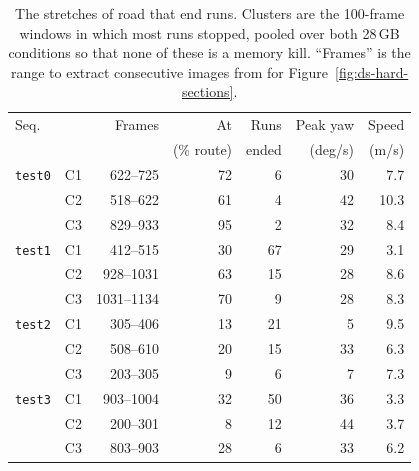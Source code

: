 \begin{table}[!htbp]
\centering
\caption{The stretches of road that end runs. Clusters are the 100-frame windows in which most runs stopped, pooled over both 28\,GB conditions so that none of these is a memory kill. ``Frames'' is the range to extract consecutive images from for Figure~\ref{fig:ds-hard-sections}.}
\label{tab:ds-hard-clusters}
\small
\begin{tabular}{@{}llrrrrr@{}}
\toprule
Seq. & & Frames & At & Runs & Peak yaw & Speed \\
 & & & (\% route) & ended & (deg/s) & (m/s) \\
\midrule
\texttt{test0} & C1 & 622--725 & 72 & 6 & 30 & 7.7 \\
 & C2 & 518--622 & 61 & 4 & 42 & 10.3 \\
 & C3 & 829--933 & 95 & 2 & 32 & 8.4 \\
\texttt{test1} & C1 & 412--515 & 30 & 67 & 29 & 3.1 \\
 & C2 & 928--1031 & 63 & 15 & 28 & 8.6 \\
 & C3 & 1031--1134 & 70 & 9 & 28 & 8.3 \\
\texttt{test2} & C1 & 305--406 & 13 & 21 & 5 & 9.5 \\
 & C2 & 508--610 & 20 & 15 & 33 & 6.3 \\
 & C3 & 203--305 & 9 & 6 & 7 & 7.3 \\
\texttt{test3} & C1 & 903--1004 & 32 & 50 & 36 & 3.3 \\
 & C2 & 200--301 & 8 & 12 & 44 & 3.7 \\
 & C3 & 803--903 & 28 & 6 & 33 & 6.2 \\
\bottomrule
\end{tabular}
\end{table}
